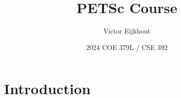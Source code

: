 \documentclass[11pt]{beamer}
\author[Eijkhout]{Victor Eijkhout}
\date[2024]{2024 COE 379L / CSE 392}
\title[PETSc]{PETSc Course}
\begin{document}
\frame{\titlepage}

\section{Introduction}


\begin{standalone}

\end{standalone}












\end{document}
